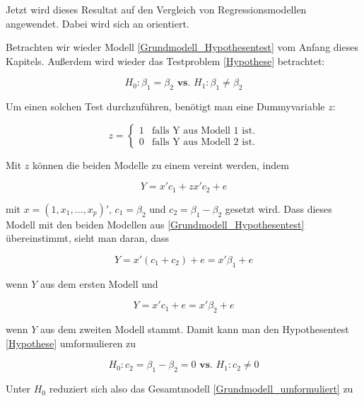 \documentclass[12pt,a4paper]{article}
\theoremstyle{definition}
\theoremstyle{definition}
\theoremstyle{definition}
\theoremstyle{definition}
\begin{document}
Jetzt wird dieses Resultat auf den Vergleich von Regressionsmodellen angewendet. Dabei wird sich an \cite[114]{Liu64} orientiert. 

Betrachten wir wieder Modell \eqref{Grundmodell_Hypothesentest} vom Anfang dieses Kapitels. Außerdem wird wieder das Testproblem \eqref{Hypothese} betrachtet:

\begin{equation*}
H_{0} : \beta_{1} = \beta_{2}  \textbf{ vs. }  H_{1} : \beta_{1} \neq \beta_{2}
\end{equation*}

Um einen solchen Test durchzuführen, benötigt man eine Dummyvariable $z$:

\begin{equation*}
z=\begin{cases}
1 & \text{falls Y aus Modell 1 ist.}\\
0 & \text{falls Y aus Modell 2 ist.} 
\end{cases}
\end{equation*}

Mit $z$ können die beiden Modelle zu einem vereint werden, indem

\begin{equation}
Y = x' c_1 + z x' c_2 + e \label{Grundmodell_umformuliert}
\end{equation}

mit $x=(1,x_1,\ldots,x_p)'$, $c_1=\beta_2$ und $c_2=\beta_1-\beta_2$ gesetzt wird. Dass dieses Modell mit den beiden Modellen aus \eqref{Grundmodell_Hypothesentest} übereinstimmt, sieht man daran, dass

\begin{equation*}
Y = x'(c_1+c_2)+e = x'\beta_1+e
\end{equation*}

wenn $Y$ aus dem ersten Modell und 

\begin{equation*}
Y = x'c_1+e = x'\beta_2+e
\end{equation*}

wenn $Y$ aus dem zweiten Modell stammt. Damit kann man den Hypothesentest \eqref{Hypothese} umformulieren zu

\begin{equation*}
H_{0} : c_2 = \beta_1-\beta_2 = 0  \textbf{ vs. }  H_{1} : c_2 \neq 0 
\end{equation*}

Unter $H_{0}$ reduziert sich also das Gesamtmodell \eqref{Grundmodell_umformuliert} zu 
\end{document}
